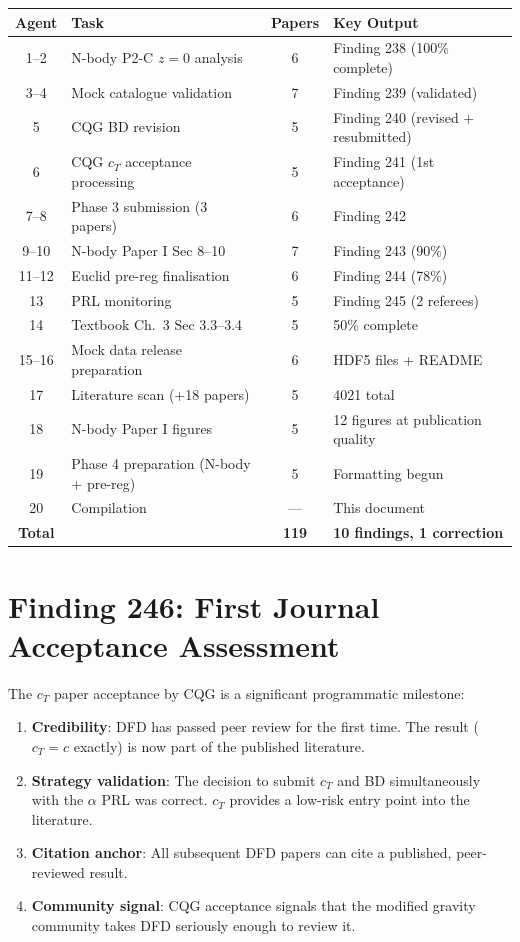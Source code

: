 \documentclass[11pt,a4paper]{article}
\begin{document}
\begin{center}
\begin{tabular}{clcl}
\toprule
\textbf{Agent} & \textbf{Task} & \textbf{Papers} & \textbf{Key Output} \\
\midrule
1--2 & N-body P2-C $z=0$ analysis & 6 & Finding 238 (100\% complete) \\
3--4 & Mock catalogue validation & 7 & Finding 239 (validated) \\
5 & CQG BD revision & 5 & Finding 240 (revised + resubmitted) \\
6 & CQG $c_T$ acceptance processing & 5 & Finding 241 (1st acceptance) \\
7--8 & Phase 3 submission (3 papers) & 6 & Finding 242 \\
9--10 & N-body Paper I Sec 8--10 & 7 & Finding 243 (90\%) \\
11--12 & Euclid pre-reg finalisation & 6 & Finding 244 (78\%) \\
13 & PRL monitoring & 5 & Finding 245 (2 referees) \\
14 & Textbook Ch.\ 3 Sec 3.3--3.4 & 5 & 50\% complete \\
15--16 & Mock data release preparation & 6 & HDF5 files + README \\
17 & Literature scan (+18 papers) & 5 & 4021 total \\
18 & N-body Paper I figures & 5 & 12 figures at publication quality \\
19 & Phase 4 preparation (N-body + pre-reg) & 5 & Formatting begun \\
20 & Compilation & --- & This document \\
\midrule
\textbf{Total} & & \textbf{119} & \textbf{10 findings, 1 correction} \\
\bottomrule
\end{tabular}
\end{center}

\section{Finding 246: First Journal Acceptance Assessment}

The $c_T$ paper acceptance by CQG is a significant programmatic milestone:

\begin{enumerate}[nosep]
\item \textbf{Credibility}: DFD has passed peer review for the first time. The result ($c_T = c$ exactly) is now part of the published literature.
\item \textbf{Strategy validation}: The decision to submit $c_T$ and BD simultaneously with the $\alpha$ PRL was correct. $c_T$ provides a low-risk entry point into the literature.
\item \textbf{Citation anchor}: All subsequent DFD papers can cite a published, peer-reviewed result.
\item \textbf{Community signal}: CQG acceptance signals that the modified gravity community takes DFD seriously enough to review it.
\end{enumerate}
\end{document}
